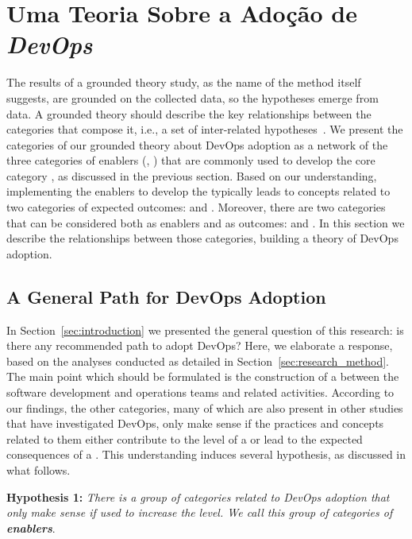 \section{Uma Teoria Sobre a Adoção de \textit{DevOps}}

The results of a grounded theory study, as the name of the method itself
suggests, are grounded on the collected data, so the hypotheses emerge from
data. A grounded theory should describe the key relationships between the
categories that compose it, i.e., a set of inter-related hypotheses~\cite{hoda2017becoming}.
We present the categories of our grounded theory
about DevOps adoption as a network of the three categories of enablers (,
) that are commonly used to develop the core category
\cc, as discussed in the previous section. Based on our understanding,
implementing the enablers to develop the \cc typically leads
to concepts related to two categories of expected outcomes:
 and . Moreover, there are two categories that can be considered
both as enablers and as outcomes:  and .
In this section we describe the relationships between those categories, building a theory
of DevOps adoption.

\subsection{A General Path for DevOps Adoption}

In Section~\ref{sec:introduction} we presented the general question of this
research: is there any recommended path to adopt DevOps? Here, we elaborate a response,
based on the analyses conducted as detailed in Section~\ref{sec:research_method}. The main
point which should be formulated is the construction of a  between the software development and operations teams and
related activities. According to our findings, the other categories,
many of which are also present in other studies that have investigated DevOps,
only make sense if the practices and
concepts related to them either contribute to the level of a \cc or lead to the expected consequences
of a \cc. This understanding induces several hypothesis, as discussed in
what follows.

\begin{mh}
\textbf{Hypothesis 1:} \textit{There is a group of categories related to DevOps adoption
that only make sense if used to increase the} \cc \emph{level. We
call this group of categories of \textbf{enablers}}.
\end{mh}

